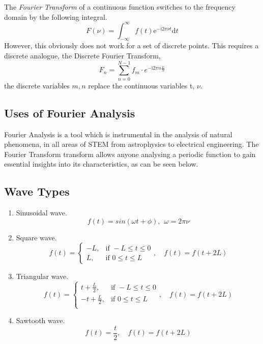 \documentclass{article}
\begin{document}
\indent The \textit{Fourier Transform} of a continuous function switches to the frequency domain by the following integral.
\begin{equation}
F( \nu )=\int_{-\infty}^{\infty}f(t)\mathrm{e}^{-\mathrm{i}2\pi \nu t}\mathrm{d}t
\label{eq: FT}
\end{equation}
However, this obviously does not work for a set of discrete points. This requires a discrete analogue, the Discrete Fourier Transform,
\begin{equation}
F_n = \sum_{n=0}^{N-1}f_m \cdot  e^{-\mathrm{i} 2\pi n \frac{\nu}{N}}
\label{eq: DFT}
\end{equation}
the discrete variables $m,n$ replace the continuous variables t, $\nu$.
\subsection{Uses of Fourier Analysis}
Fourier Analysis is a tool which is instrumental in the analysis of natural phenomena, in all areas of STEM from astrophysics to electrical engineering. The Fourier Transform transform allows anyone analysing a periodic function to gain essential insights into its characteristics, as can be seen below.
\subsection{Wave Types}
\begin{enumerate}
\item Sinusoidal wave.
\begin{equation}
f(t)=sin(\omega t +\phi), ~~\omega = 2\pi\nu
\end{equation}
\item Square wave.
\begin{equation}
f(t)=
	\begin{cases}
			-L, & \text{if } -L \leq t \leq 0 \\
			L, & \text{if } 0 \leq t \leq L
	\end{cases}, \quad
f(t)=f(t+2L)
\end{equation}
\item Triangular wave.
\begin{equation}
f(t)=
	\begin{cases}
			t + \frac{L}{2}, & \text{if } -L\leq t \leq 0 \\
			-t + \frac{L}{2}, & \text{if } 0\leq t\leq L\\
	\end{cases},\quad
f(t)=f(t+2L)	
\end{equation}
\item Sawtooth wave.
\begin{equation}
f(t)=\frac{t}{2},\quad f(t)=f(t+2L)
\end{equation}
\end{enumerate}
\end{document}
